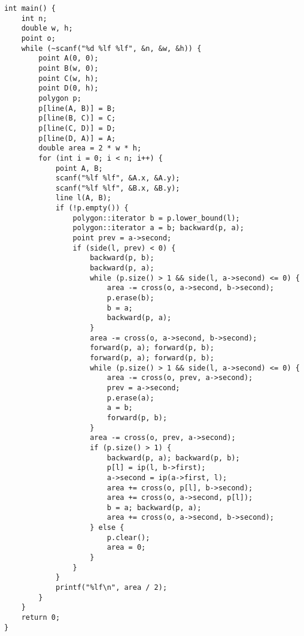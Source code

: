\begin{verbatim}
int main() {
    int n;
    double w, h;
    point o;
    while (~scanf("%d %lf %lf", &n, &w, &h)) {
        point A(0, 0);
        point B(w, 0);
        point C(w, h);
        point D(0, h);
        polygon p;
        p[line(A, B)] = B;
        p[line(B, C)] = C;
        p[line(C, D)] = D;
        p[line(D, A)] = A;
        double area = 2 * w * h;
        for (int i = 0; i < n; i++) {
            point A, B;
            scanf("%lf %lf", &A.x, &A.y);
            scanf("%lf %lf", &B.x, &B.y);
            line l(A, B);
            if (!p.empty()) {
                polygon::iterator b = p.lower_bound(l);
                polygon::iterator a = b; backward(p, a);
                point prev = a->second;
                if (side(l, prev) < 0) {
                    backward(p, b);
                    backward(p, a);
                    while (p.size() > 1 && side(l, a->second) <= 0) {
                        area -= cross(o, a->second, b->second);
                        p.erase(b);
                        b = a;
                        backward(p, a);
                    }
                    area -= cross(o, a->second, b->second);
                    forward(p, a); forward(p, b);
                    forward(p, a); forward(p, b);
                    while (p.size() > 1 && side(l, a->second) <= 0) {
                        area -= cross(o, prev, a->second);
                        prev = a->second;
                        p.erase(a);
                        a = b;
                        forward(p, b);
                    }
                    area -= cross(o, prev, a->second);
                    if (p.size() > 1) {
                        backward(p, a); backward(p, b);
                        p[l] = ip(l, b->first);
                        a->second = ip(a->first, l);
                        area += cross(o, p[l], b->second);
                        area += cross(o, a->second, p[l]);
                        b = a; backward(p, a);
                        area += cross(o, a->second, b->second);
                    } else {
                        p.clear();
                        area = 0;
                    }
                }
            }
            printf("%lf\n", area / 2);
        }
    }
    return 0;
}
\end{verbatim}
